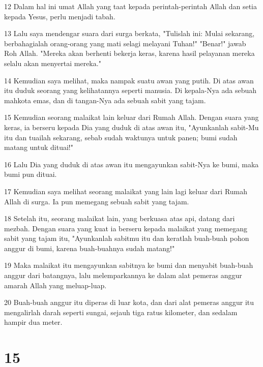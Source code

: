 \par 12 Dalam hal ini umat Allah yang taat kepada perintah-perintah Allah dan setia kepada Yesus, perlu menjadi tabah.
\par 13 Lalu saya mendengar suara dari surga berkata, "Tulislah ini: Mulai sekarang, berbahagialah orang-orang yang mati selagi melayani Tuhan!" "Benar!" jawab Roh Allah. "Mereka akan berhenti bekerja keras, karena hasil pelayanan mereka selalu akan menyertai mereka."
\par 14 Kemudian saya melihat, maka nampak suatu awan yang putih. Di atas awan itu duduk seorang yang kelihatannya seperti manusia. Di kepala-Nya ada sebuah mahkota emas, dan di tangan-Nya ada sebuah sabit yang tajam.
\par 15 Kemudian seorang malaikat lain keluar dari Rumah Allah. Dengan suara yang keras, ia berseru kepada Dia yang duduk di atas awan itu, "Ayunkanlah sabit-Mu itu dan tuailah sekarang, sebab sudah waktunya untuk panen; bumi sudah matang untuk dituai!"
\par 16 Lalu Dia yang duduk di atas awan itu mengayunkan sabit-Nya ke bumi, maka bumi pun dituai.
\par 17 Kemudian saya melihat seorang malaikat yang lain lagi keluar dari Rumah Allah di surga. Ia pun memegang sebuah sabit yang tajam.
\par 18 Setelah itu, seorang malaikat lain, yang berkuasa atas api, datang dari mezbah. Dengan suara yang kuat ia berseru kepada malaikat yang memegang sabit yang tajam itu, "Ayunkanlah sabitmu itu dan keratlah buah-buah pohon anggur di bumi, karena buah-buahnya sudah matang!"
\par 19 Maka malaikat itu mengayunkan sabitnya ke bumi dan menyabit buah-buah anggur dari batangnya, lalu melemparkannya ke dalam alat pemeras anggur amarah Allah yang meluap-luap.
\par 20 Buah-buah anggur itu diperas di luar kota, dan dari alat pemeras anggur itu mengalirlah darah seperti sungai, sejauh tiga ratus kilometer, dan sedalam hampir dua meter.

\chapter{15}

